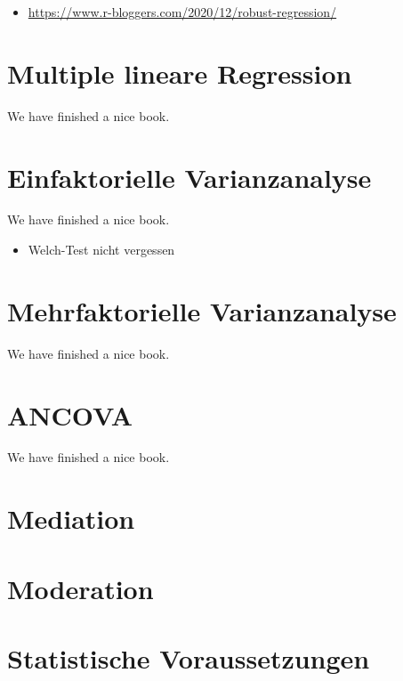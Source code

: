 \documentclass[
]{book}
\providecommand{\tightlist}{%
  \setlength{\itemsep}{0pt}\setlength{\parskip}{0pt}}
\begin{document}
\begin{itemize}
\tightlist
\item
  \url{https://www.r-bloggers.com/2020/12/robust-regression/}
\end{itemize}

\hypertarget{multiple-lineare-regression}{%
\chapter{Multiple lineare Regression}\label{multiple-lineare-regression}}

We have finished a nice book.

\hypertarget{einfaktorielle-varianzanalyse}{%
\chapter{Einfaktorielle Varianzanalyse}\label{einfaktorielle-varianzanalyse}}

We have finished a nice book.

\begin{itemize}
\tightlist
\item
  Welch-Test nicht vergessen
\end{itemize}

\hypertarget{mehrfaktorielle-varianzanalyse}{%
\chapter{Mehrfaktorielle Varianzanalyse}\label{mehrfaktorielle-varianzanalyse}}

We have finished a nice book.

\hypertarget{ancova}{%
\chapter{ANCOVA}\label{ancova}}

We have finished a nice book.

\hypertarget{mediation}{%
\chapter{Mediation}\label{mediation}}

\hypertarget{moderation}{%
\chapter{Moderation}\label{moderation}}

\hypertarget{statistische-voraussetzungen}{%
\chapter{Statistische Voraussetzungen}\label{statistische-voraussetzungen}}
\end{document}
